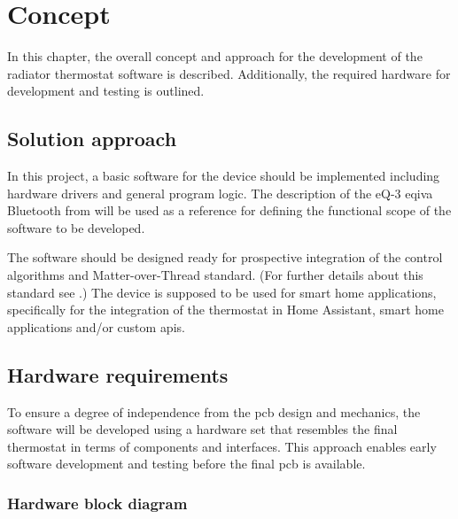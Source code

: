 %
%

\chapter{Concept}
\label{chap:Concept}
In this chapter, the overall concept and approach for the development of the radiator thermostat software is described. Additionally, the required hardware for development and testing is outlined.

\section{Solution approach}
\label{sec:Solution approach}
In this project, a basic software for the device should be implemented including hardware drivers and general program logic. The description of the eQ-3 eqiva Bluetooth from \cite{eQ3AG.05.2018} will be used as a reference for defining the functional scope of the software to be developed.

The software should be designed ready for prospective integration of the control algorithms and Matter-over-Thread standard. (For further details about this standard see \cite{enwiki:matter}.) The device is supposed to be used for smart home applications, specifically for the integration of the thermostat in Home Assistant, smart home applications and/or custom \acp{api}.

\section{Hardware requirements}
\label{sec:Hardware requirements}

To ensure a degree of independence from the \acs{pcb} design and mechanics, the software will be developed using a hardware set that resembles the final thermostat in terms of components and interfaces. This approach enables early software development and testing before the final \acs{pcb} is available.

\subsection{Hardware block diagram}
\label{sec:Hardware block diagram}

